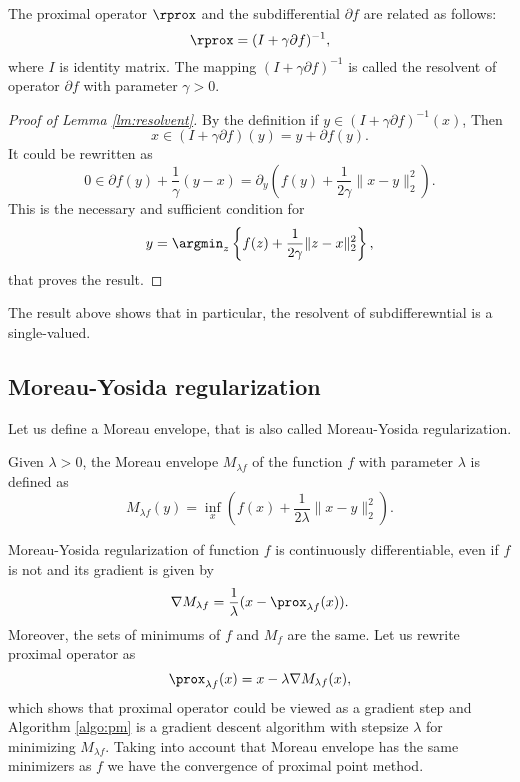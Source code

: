 {\begin{lemma}[Resolvent]\label{lm:resolvent}
    The proximal operator $\rprox$ and the subdifferential $\partial f$ are related as follows:
    \begin{equation}\label{eq:resolvent}
        \rprox = (I+\gamma\partial f)^{-1}, 
    \end{equation}
    where $I$ is identity matrix.
    The mapping $(I+\gamma\partial f)^{-1}$ is called the resolvent of operator $\partial f$ with parameter $\gamma>0$.
\end{lemma}
\begin{proof}[Proof of Lemma \ref{lm:resolvent}]
By the definition if $y\in (I+\gamma\partial f)^{-1}(x)$, Then
$$
x\in (I+\gamma\partial f)(y) = y + \partial f(y).
$$
It could be rewritten as
$$
0\in \partial f(y) + \frac{1}{\gamma}(y-x) = \partial_y \left(f(y) + \frac{1}{2\gamma}\|x-y\|_2^2\right).
$$
This is the necessary and sufficient condition for 
$$
y = \argmin_z\left\{f(z) + \frac{1}{2\gamma}\|z-x\|_2^2\right\},
$$
that proves the result.
\end{proof}
The result above shows that in particular, the resolvent of subdifferewntial is a single-valued.

\subsection{Moreau-Yosida regularization}
Let us define a Moreau envelope, that is also called Moreau-Yosida regularization.

\begin{definition}
Given $\lambda>0$, the Moreau envelope $M_{\lambda f}$ of the function $f$ with parameter $\lambda$ is defined as 
\begin{equation}\label{eq:M-Y}
M_{\lambda f}(y) = \inf_x\left(f(x) + \frac{1}{2\lambda}\|x-y\|_2^2\right).
\end{equation}
\end{definition}

Moreau-Yosida regularization of function $f$ is continuously differentiable, even if $f$ is not and its gradient is given by
\begin{equation}\label{eq:M-Y_grad}
\nabla M_{\lambda f} = \frac{1}{\lambda}(x-\prox_{\lambda f}(x)).
\end{equation}
Moreover, the sets of minimums of $f$ and $M_f$ are the same. Let us rewrite proximal operator as
$$
\prox_{\lambda f}(x) = x - \lambda\nabla M_{\lambda f}(x),
$$
which shows that proximal operator could be viewed as a gradient step and Algorithm \ref{algo:pm} is a gradient descent algorithm with stepsize $\lambda$ for minimizing $M_{\lambda f}$. Taking into account that Moreau envelope has the same minimizers as $f$ we have the convergence of proximal point method.


}
